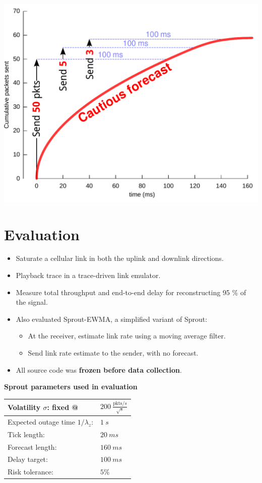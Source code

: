 \begin{multicols}{2}
\begin{centering}
\includegraphics[width=0.5\columnwidth]{forecast-final.pdf}

\end{centering}


\section*{Evaluation}
{\large \bf
\begin{itemize}
\item Saturate a cellular link in both the uplink and downlink directions.
\item Playback trace in a trace-driven link emulator.
\item Measure total throughput and end-to-end delay for reconstructing 95 \% of the signal.
\item Also evaluated Sprout-EWMA, a simplified variant of Sprout:
      \begin{itemize}
      \item At the receiver, estimate link rate using a moving average filter.
      \item Send link rate estimate to the sender, with no forecast.
      \end{itemize}
\item All source code was \textbf{frozen before data collection}.
\end{itemize}
}

{\large \bf
\begin{center}
\textbf{Sprout parameters used in evaluation} \\
\begin{tabular}{|l|l|}
\hline
Volatility $\sigma$: fixed @ & $200~\frac{\textrm{pkts}/s}{\sqrt{s}}$ \\
\hline
Expected outage time $1/\lambda_z$: & $1~s$ \\
\hline
Tick length: & $20~ms$ \\
\hline
Forecast length: & $160~ms$ \\
\hline
Delay target: & $100~ms$ \\
\hline
Risk tolerance: & $5 \%$ \\
\hline
\end{tabular}
\end{center}
}
\vspace{\baselineskip}



\end{multicols}

